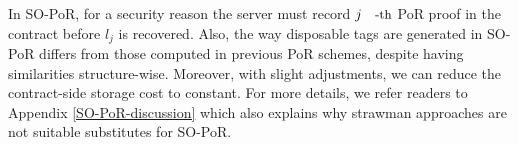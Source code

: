 \begin{remark}
In SO-PoR, for a security reason the server must record $j\text{\small{-th}}$ PoR proof in the contract before $l_{\scriptscriptstyle j}$ is recovered. Also,  the way disposable tags are generated in SO-PoR  differs from those computed  in previous PoR schemes, despite having similarities structure-wise. Moreover, with slight adjustments, we can reduce the contract-side storage cost to constant.  For more details, we refer readers to Appendix \ref{SO-PoR-discussion} which also explains why strawman approaches are not suitable substitutes for SO-PoR. 
\end{remark}
\vspace{-3mm}
%
%

